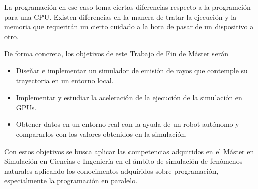 La programación en ese caso toma ciertas diferencias respecto a la programción para una CPU.
Existen diferencias en la manera de tratar la ejecución y la memoria que requerirán un cierto cuidado a la hora de pasar de un dispositivo a otro.

De forma concreta, los objetivos de este Trabajo de Fin de Máster serán
\begin{itemize}
    \item Diseñar e implementar un simulador de emisión de rayos que contemple su trayectoria en un entorno local.
    \item Implementar y estudiar la aceleración de la ejecución de la simulación en GPUs.
    \item Obtener datos en un entorno real con la ayuda de un robot autónomo y compararlos con los valores obtenidos en la simulación.
\end{itemize}

Con estos objetivos se busca aplicar las competencias adquiridos en el Máster en Simulación en Ciencias e Ingeniería en el ámbito de simulación de fenómenos naturales aplicando los conocimentos adquiridos sobre programación, especialmente la programación en paralelo.

